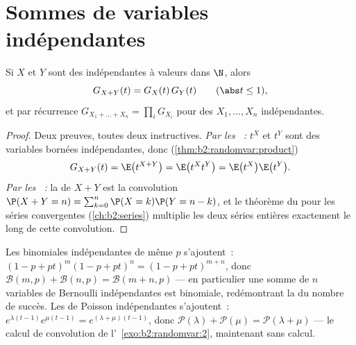 \section{Sommes de variables indépendantes}

\begin{theorem}[Multiplicativité]\label{thm:b2:genfun:product}
Si $X$ et $Y$ sont des  indépendantes à valeurs
dans $\N$, alors
\[
G_{X + Y}(t) = G_X(t)\,G_Y(t)
\qquad (\abs t \leq 1),
\]
et par récurrence $G_{X_1 + \dots + X_n} = \prod_i G_{X_i}$ pour
des $X_1, \dots, X_n$ indépendantes.
\end{theorem}

\begin{proof}
Deux preuves, toutes deux instructives. \emph{Par les ~:}
$t^X$ et $t^Y$ sont des variables bornées indépendantes, donc
(\cref{thm:b2:randomvar:product})
\[
G_{X+Y}(t) = \E\bigl(t^{X+Y}\bigr)
= \E\bigl(t^X t^Y\bigr)
= \E\bigl(t^X\bigr)\E\bigl(t^Y\bigr) .
\]
\emph{Par les ~:} la  de $X + Y$ est la
convolution $\P(X + Y = n) = \sum_{k=0}^n \P(X = k)\P(Y = n - k)$, et
le théorème du  pour les séries 
convergentes (\cref{ch:b2:series}) multiplie les deux séries entières
exactement le long de cette convolution.
\end{proof}

\begin{example}\label{ex:b2:genfun:stability}
Les binomiales indépendantes de même $p$ s'ajoutent~: $(1 - p +
pt)^m(1 - p + pt)^n = (1 - p + pt)^{m+n}$, donc $\mathcal{B}(m, p) +
\mathcal{B}(n, p) = \mathcal{B}(m + n, p)$ --- en particulier une somme
de $n$ variables de Bernoulli indépendantes est binomiale,
redémontrant la  du nombre de succès. Les  de Poisson
indépendantes s'ajoutent~:
$e^{\lambda(t-1)}e^{\mu(t-1)} = e^{(\lambda + \mu)(t-1)}$, donc
$\mathcal{P}(\lambda) + \mathcal{P}(\mu) = \mathcal{P}(\lambda +
\mu)$ --- le calcul de convolution de
l'~\cref{exo:b2:randomvar:2}, maintenant sans calcul.
\end{example}

